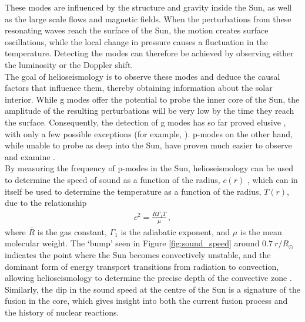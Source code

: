 \documentclass[11pt,a4paper,onecolumn]{report}
\begin{document}
These modes are influenced by the structure and gravity inside the Sun, as well
as the large scale flows and magnetic fields. When the perturbations from these
resonating waves reach the surface of the Sun, the motion creates surface
oscillations, while the local change in pressure causes a fluctuation in the
temperature. Detecting the modes can therefore be achieved by observing either the
luminosity or the Doppler shift.\\

The goal of helioseismology is to observe these modes and deduce the causal
factors that influence them, thereby obtaining information about the solar
interior. While g modes offer the potential to probe the inner core of the Sun,
the amplitude of the resulting perturbations will be very low by the time they
reach the surface. Consequently, the detection of g modes has so far proved
elusive \citep{appourchaux_quest_2010}, with only a few possible exceptions (for
example, \citealp{fossat_asymptotic_2017}). p-modes on the other hand, while
unable to probe as deep into the Sun, have proven much easier to observe and
examine \citep{deubner_observations_1975}. \\

By measuring the frequency of p-modes in the Sun, helioseismology can be used to determine
the speed of sound as a function of the radius, \(c\left(r\right)\)
\citep{christensen-dalsgaard_speed_1985}, which can in itself be used to
determine the temperature as a function of the radius, \(T\left(r\right)\), due
to the relationship
\begin{align}
  c^2 = \frac{\bar{R}\Gamma_1 T}{\mu} \,,
\end{align}
where \(\bar{R}\) is the gas constant, \(\Gamma_1\) is the adiabatic exponent,
and \(\mu\) is the mean molecular weight. The `bump' seen in Figure
\ref{fig:sound_speed} around \(\SI{0.7}{r \per R_\odot}\) indicates the point where the
Sun becomes convectively unstable, and the dominant form of energy transport
transitions from radiation to convection, allowing helioseismology to determine
the precise depth of the convective zone
\citep{christensen-dalsgaard_speed_1985}. Similarly, the dip in the sound speed
at the centre of the Sun is a signature of the fusion in the core, which gives
insight into both the current fusion process and the history of nuclear
reactions. \\

\end{document}
